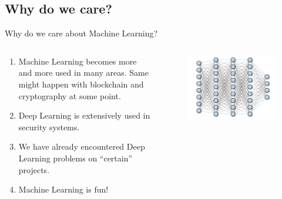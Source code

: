 \documentclass{beamer}
\begin{document}
	\subsection{Why do we care?}
	\begin{frame}{Why do we care about Machine Learning?}		
		\begin{columns}
        \begin{column}{0.5\textwidth}
            \begin{enumerate}
                \item Machine Learning becomes more and more used in many areas. Same might happen with blockchain and cryptography at some point.
                \item Deep Learning is extensively used in security systems.
                \item We have already encountered Deep Learning problems on ``certain'' projects.
                \item Machine Learning is fun!
            \end{enumerate}
        \end{column}
        \begin{column}{0.5\textwidth}
            \begin{figure}
            \centering
                \includegraphics[width=1\textwidth]{images/presentation/web.png}
            \end{figure}
        \end{column}
        \end{columns}
	\end{frame}
\end{document}
